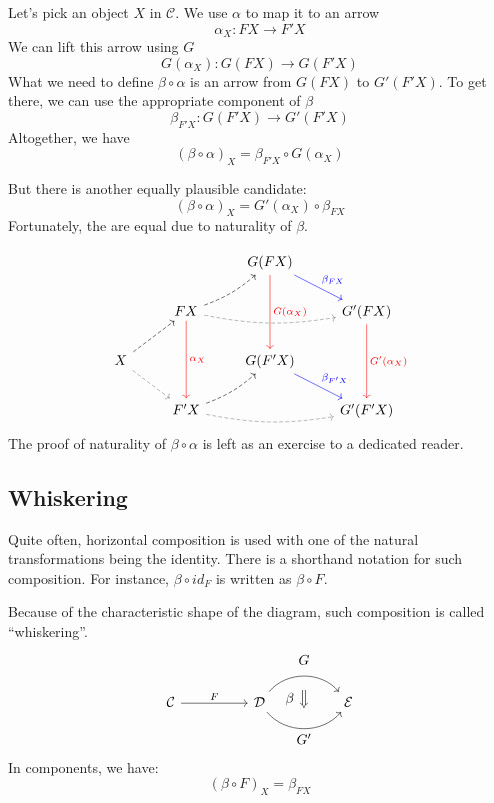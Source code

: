\documentclass[DaoFP]{subfiles}
\begin{document}
Let's pick an object $X$ in $\mathcal{C}$. We use $\alpha$ to map it to an arrow 
\[ \alpha_X \colon F X \to F' X \]
We can lift this arrow using $G$
\[ G (\alpha_X) \colon G (F X) \to G (F' X) \]
What we need to define $\beta \circ \alpha$ is an arrow from $G (F X)$ to $G' (F' X)$. To get there, we can use the appropriate component of $\beta$
\[ \beta_{F' X} \colon G (F' X) \to G' (F' X) \]
Altogether, we have
\[ (\beta \circ \alpha)_X = \beta_{F' X} \circ G (\alpha_X) \]

But there is another equally plausible candidate: 
\[ (\beta \circ \alpha)_X = G'(\alpha_X) \circ \beta_{F X}\]
Fortunately, the are equal due to naturality of $\beta$. 

\[
 \begin{tikzcd}
  && G(F X)
  \arrow[dd, red, "G(\alpha_X)"]
  \arrow[dr, blue, "\beta_{F X}"]
  \\
  & F X
  \arrow[rr, bend right=10, dashed, gray]
  \arrow[ur, bend right=10, dashed]
  \arrow[dd, red, "\alpha_X"]
 && G' (F X)
  \arrow[dd, red, "G'(\alpha_X)"]
 \\
 X
 \arrow[ur, dashed]
 \arrow[dr, gray, dashed]
 && G(F' X)
  \arrow[dr, blue, "\beta_{F' X}"]
 \\
 &F' X
  \arrow[rr, bend right=10, dashed, gray]
 \arrow[ur, bend right=10, dashed]
 && G'(F' X)
\end{tikzcd}
\]
The proof of naturality of $\beta \circ \alpha$ is left as an exercise to a dedicated reader.

\subsection{Whiskering}

Quite often, horizontal composition is used with one of the natural transformations being the identity. There is a shorthand notation for such composition. For instance, $\beta \circ id_F$ is written as $\beta \circ F$. 

Because of the characteristic shape of the diagram, such composition is called ``whiskering''.
\[
\begin{tikzcd}[column sep=huge]
\mathcal{C}
 \arrow[r, "F"]
 &
\mathcal{D}
  \arrow[bend left=50]{r}[name=U1, label=above:$G$]{}
  \arrow[bend right=50]{r}[name=D1, label=below:$G'$]{} 
 &
\mathcal{E}
  \arrow[shorten <=10pt,shorten >=10pt,Rightarrow,to path={(U1) -- node[label=left:$\beta$] {} (D1)}]{}
\end{tikzcd}
\]
In components, we have:
\[ (\beta \circ F)_X = \beta_{F X} \]
\end{document}
